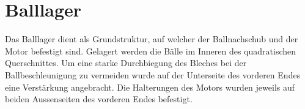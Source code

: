 \section{Balllager}
Das Balllager dient als Grundstruktur, auf welcher der Ballnachschub und der 
Motor befestigt sind. Gelagert werden die Bälle im Inneren des quadratischen 
Querschnittes. Um eine starke Durchbiegung des Bleches bei der 
Ballbeschleunigung zu vermeiden wurde auf der Unterseite des vorderen Endes 
eine Verstärkung angebracht. Die Halterungen des Motors wurden jeweils auf 
beiden Aussenseiten des vorderen Endes befestigt.
